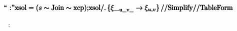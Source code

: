 \documentclass{article}
\newcommand{\unicode}[1]{{}}
\begin{document}
\begin{doublespace}
\noindent\(\pmb{\text{{``}$\unicode{043e}\unicode{0431}\unicode{0449}\unicode{0435}\unicode{0435}$ $\unicode{0440}\unicode{0435}\unicode{0448}\unicode{0435}\unicode{043d}\unicode{0438}\unicode{0435}$:{''}}}\\
\pmb{\text{xsol}=(s\sim \text{Join}\sim \text{xcp});}\\
\pmb{\text{xsol}\text{/.}\left\{\xi \__{\text{u$\_$}\unicode{f3d5}\text{v$\_$}}\to \xi _{u,v}\right\}\text{//}\text{Simplify}\text{//}\text{TableForm}}\)
\end{doublespace}

\begin{doublespace}
\noindent\(\text{$\unicode{043e}\unicode{0431}\unicode{0449}\unicode{0435}\unicode{0435}$ $\unicode{0440}\unicode{0435}\unicode{0448}\unicode{0435}\unicode{043d}\unicode{0438}\unicode{0435}$:}\)
\end{doublespace}
\end{document}
